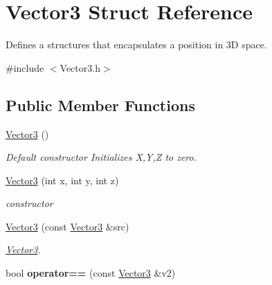 \hypertarget{structVector3}{\section{Vector3 Struct Reference}
\label{structVector3}
}


Defines a structures that encapsulates a position in 3\-D space.  




{\ttfamily \#include $<$Vector3.\-h$>$}

\subsection*{Public Member Functions}
\begin{DoxyCompactItemize}
\item 
\hypertarget{structVector3_a0f49191f7e001e7f7ae1cb49522118b4}{\hyperlink{structVector3_a0f49191f7e001e7f7ae1cb49522118b4}{Vector3} ()}\label{structVector3_a0f49191f7e001e7f7ae1cb49522118b4}

\begin{DoxyCompactList}\small\item\em Default constructor Initializes X,Y,Z to zero. \end{DoxyCompactList}\item 
\hyperlink{structVector3_af7339592cdacffdfc39566133bd285d0}{Vector3} (int x, int y, int z)
\begin{DoxyCompactList}\small\item\em constructor \end{DoxyCompactList}\item 
\hyperlink{structVector3_a48b47d99e6445850a61e57eb850a5a4f}{Vector3} (const \hyperlink{structVector3}{Vector3} \&src)
\begin{DoxyCompactList}\small\item\em \hyperlink{structVector3}{Vector3}. \end{DoxyCompactList}\item 
\hypertarget{structVector3_a426560c251dee5150b4a951bbabd0a0f}{bool {\bfseries operator==} (const \hyperlink{structVector3}{Vector3} \&v2)}\label{structVector3_a426560c251dee5150b4a951bbabd0a0f}

\end{DoxyCompactItemize}
